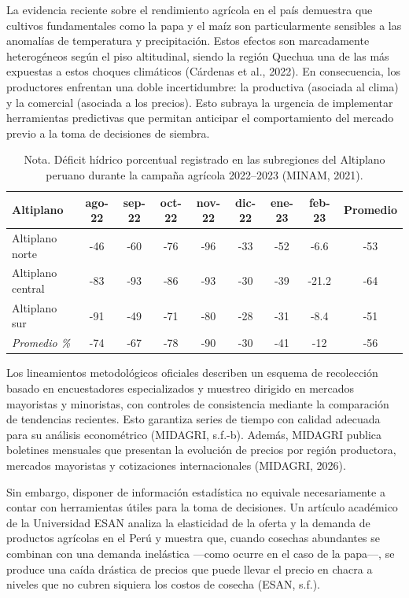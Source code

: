 \documentclass[12pt, a4paper]{report}
\begin{document}
La evidencia reciente sobre el rendimiento agrícola en el país demuestra que cultivos fundamentales como la papa y el maíz son particularmente sensibles a las anomalías de temperatura y precipitación. Estos efectos son marcadamente heterogéneos según el piso altitudinal, siendo la región Quechua una de las más expuestas a estos choques climáticos (Cárdenas et al., 2022). En consecuencia, los productores enfrentan una doble incertidumbre: la productiva (asociada al clima) y la comercial (asociada a los precios). Esto subraya la urgencia de implementar herramientas predictivas que permitan anticipar el comportamiento del mercado previo a la toma de decisiones de siembra.

\begin{table}[h]
\centering
\caption{Anomalías del Altiplano por mes (ago-22 a feb-23)}
\vspace{6pt}
\begin{tabular}{lcccccccc}
\toprule
\textbf{Altiplano} & \textbf{ago-22} & \textbf{sep-22} & \textbf{oct-22} & \textbf{nov-22} & \textbf{dic-22} & \textbf{ene-23} & \textbf{feb-23} & \textbf{Promedio} \\
\midrule
Altiplano norte    & -46 & -60 & -76 & -96 & -33 & -52 & -6.6  & -53 \\
Altiplano central  & -83 & -93 & -86 & -93 & -30 & -39 & -21.2 & -64 \\
Altiplano sur      & -91 & -49 & -71 & -80 & -28 & -31 & -8.4  & -51 \\
\midrule
\textit{Promedio \%} & -74 & -67 & -78 & -90 & -30 & -41 & -12   & -56 \\
\bottomrule
\end{tabular}
\caption*{Nota. Déficit hídrico porcentual registrado en las subregiones del Altiplano peruano durante la campaña agrícola 2022--2023 (MINAM, 2021).}
\end{table}

Los lineamientos metodológicos oficiales describen un esquema de recolección basado en encuestadores especializados y muestreo dirigido en mercados mayoristas y minoristas, con controles de consistencia mediante la comparación de tendencias recientes. Esto garantiza series de tiempo con calidad adecuada para su análisis econométrico (MIDAGRI, s.f.-b). Además, MIDAGRI publica boletines mensuales que presentan la evolución de precios por región productora, mercados mayoristas y cotizaciones internacionales (MIDAGRI, 2026).

Sin embargo, disponer de información estadística no equivale necesariamente a contar con herramientas útiles para la toma de decisiones. Un artículo académico de la Universidad ESAN analiza la elasticidad de la oferta y la demanda de productos agrícolas en el Perú y muestra que, cuando cosechas abundantes se combinan con una demanda inelástica ---como ocurre en el caso de la papa---, se produce una caída drástica de precios que puede llevar el precio en chacra a niveles que no cubren siquiera los costos de cosecha (ESAN, s.f.).
\end{document}
